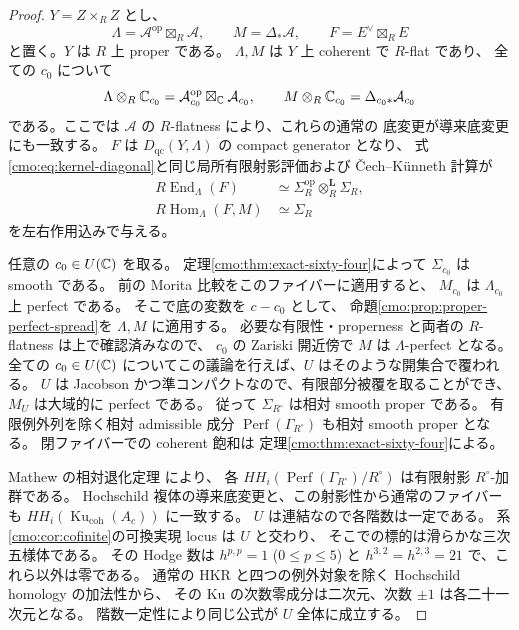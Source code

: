 \begin{proof}
$Y=Z\times_R Z$ とし、
\[
 \Lambda=\mathcal A^{\mathrm{op}}\boxtimes_R\mathcal A,
 \qquad M=\Delta_*\mathcal A,\qquad
 F=E^\vee\boxtimes_R E
\]
と置く。$Y$ は $R$ 上 proper である。
$\Lambda,M$ は $Y$ 上 coherent で $R$-flat であり、
全ての $c_0$ について
\[
 \Lambda\otimes_R\mathbb C_{c_0}
   =\mathcal A_{c_0}^{\mathrm{op}}\boxtimes_\mathbb C\mathcal A_{c_0},
 \qquad
 M\otimes_R\mathbb C_{c_0}=\Delta_{c_0*}\mathcal A_{c_0}
\]
である。ここでは $\mathcal A$ の $R$-flatness により、これらの通常の
底変更が導来底変更にも一致する。
$F$ は $D_{\mathrm{qc}}(Y,\Lambda)$ の compact generator となり、
式\eqref{cmo:eq:kernel-diagonal}と同じ局所有限射影評価および
\v Cech--K\"unneth 計算が
\[
 \begin{aligned}
 R\operatorname{End}_\Lambda(F)
 &\simeq\Sigma_R^{\mathrm{op}}\otimes_R^{\mathbf L}\Sigma_R,\\
 R\operatorname{Hom}_\Lambda(F,M)&\simeq\Sigma_R
 \end{aligned}
\]
を左右作用込みで与える。

任意の $c_0\in U(\mathbb C)$ を取る。
定理\ref{cmo:thm:exact-sixty-four}によって $\Sigma_{c_0}$ は smooth である。
前の Morita 比較をこのファイバーに適用すると、
$M_{c_0}$ は $\Lambda_{c_0}$ 上 perfect である。
そこで底の変数を $c-c_0$ として、
命題\ref{cmo:prop:proper-perfect-spread}を $\Lambda,M$ に適用する。
必要な有限性・properness と両者の $R$-flatness は上で確認済みなので、
$c_0$ の Zariski 開近傍で $M$ は $\Lambda$-perfect となる。
全ての $c_0\in U(\mathbb C)$ についてこの議論を行えば、$U$ はそのような開集合で覆われる。
$U$ は Jacobson かつ準コンパクトなので、有限部分被覆を取ることができ、
$M_U$ は大域的に perfect である。
従って $\Sigma_{R^\circ}$ は相対 smooth proper である。
有限例外列を除く相対 admissible 成分 $\operatorname{Perf}(\Gamma_{R^\circ})$
も相対 smooth proper となる。
閉ファイバーでの coherent 飽和は
定理\ref{cmo:thm:exact-sixty-four}による。

Mathew の相対退化定理 \cite[Theorem~1.3]{CMOMathewDegeneration}により、
各 $HH_i(\operatorname{Perf}(\Gamma_{R^\circ})/R^\circ)$ は有限射影 $R^\circ$-加群である。
Hochschild 複体の導来底変更と、この射影性から通常のファイバーも
$HH_i(\operatorname{Ku}_{\mathrm{coh}}(A_c))$ に一致する。
$U$ は連結なので各階数は一定である。
系\ref{cmo:cor:cofinite}の可換実現 locus は $U$ と交わり、
そこでの標的は滑らかな三次五様体である。
その Hodge 数は $h^{p,p}=1$ ($0\le p\le5$) と
$h^{3,2}=h^{2,3}=21$ で、これら以外は零である。
通常の HKR と四つの例外対象を除く Hochschild homology の加法性から、
その Ku の次数零成分は二次元、次数 $\pm1$ は各二十一次元となる。
階数一定性により同じ公式が $U$ 全体に成立する。
\end{proof}

